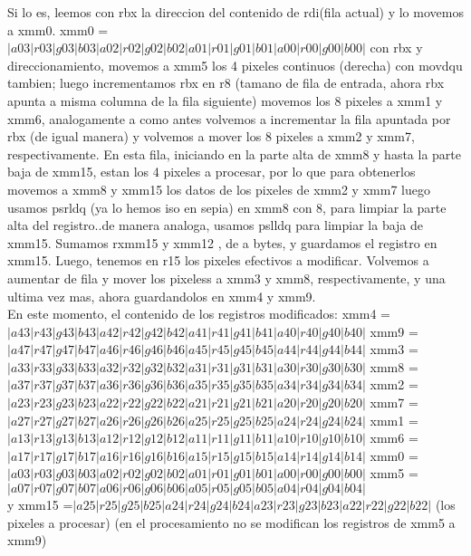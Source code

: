 \documentclass[a4paper]{article}
\begin{document}
	Si lo es, leemos con rbx la direccion del contenido de rdi(fila actual) y lo movemos a xmm0.	
	\hfill \break
	 xmm0 = $|a03|r03|g03|b03|a02|r02|g02|b02|a01|r01|g01|b01|a00|r00|g00|b00| $
	 \hfill \break
 con rbx y direccionamiento,	movemos a xmm5 los 4 pixeles continuos (derecha) con movdqu tambien;
 luego incrementamos rbx en r8 (tamano de fila de entrada, ahora rbx apunta a misma columna de la fila siguiente)
 movemos los 8 pixeles a xmm1 y xmm6, analogamente a como antes
 volvemos a incrementar la fila apuntada por rbx (de igual manera)
 y volvemos a mover los 8 pixeles a xmm2 y xmm7, respectivamente.
 \hfill \break
 En esta fila, iniciando en la parte alta de xmm8 y hasta la parte baja de xmm15,  estan los 4 pixeles a procesar, por lo que para obtenerlos movemos a xmm8 y xmm15 los datos de los pixeles de xmm2 y xmm7
 luego usamos psrldq (ya lo hemos iso en sepia) en xmm8 con 8, para limpiar la parte alta del registro..de manera analoga, usamos pslldq para limpiar la baja de xmm15. Sumamos rxmm15 y xmm12 , de a bytes, y guardamos el registro en xmm15. 
 Luego, tenemos en r15 los pixeles efectivos a modificar. 
 \hfill \break
 Volvemos a aumentar de fila y mover los pixeless a xmm3 y xmm8, respectivamente, y una ultima vez mas, ahora guardandolos en xmm4 y xmm9.
 \hfill \break
 \\
En este momento, el contenido de los registros modificados:
\hfill \break
xmm4 = $|a43|r43|g43|b43|a42|r42|g42|b42|a41|r41|g41|b41|a40|r40|g40|b40|$
\hfill \break
xmm9 = $|a47|r47|g47|b47|a46|r46|g46|b46|a45|r45|g45|b45|a44|r44|g44|b44|$
\hfill \break
xmm3 = $|a33|r33|g33|b33|a32|r32|g32|b32|a31|r31|g31|b31|a30|r30|g30|b30|$
\hfill \break
xmm8 = $|a37|r37|g37|b37|a36|r36|g36|b36|a35|r35|g35|b35|a34|r34|g34|b34|$
\hfill \break
xmm2 = $|a23|r23|g23|b23|a22|r22|g22|b22|a21|r21|g21|b21|a20|r20|g20|b20|$
\hfill \break
xmm7 = $|a27|r27|g27|b27|a26|r26|g26|b26|a25|r25|g25|b25|a24|r24|g24|b24| $
\hfill \break
xmm1 =$ |a13|r13|g13|b13|a12|r12|g12|b12|a11|r11|g11|b11|a10|r10|g10|b10|$
\hfill \break
xmm6 = $|a17|r17|g17|b17|a16|r16|g16|b16|a15|r15|g15|b15|a14|r14|g14|b14|$
\hfill \break
xmm0 =$ |a03|r03|g03|b03|a02|r02|g02|b02|a01|r01|g01|b01|a00|r00|g00|b00|$ 
\hfill \break
xmm5 =$ |a07|r07|g07|b07|a06|r06|g06|b06|a05|r05|g05|b05|a04|r04|g04|b04|$
\hfill \break
 \\
 
y xmm15 =$|a25|r25|g25|b25|a24|r24|g24|b24|a23|r23|g23|b23|a22|r22|g22|b22|$
\hfill \break 
(los pixeles a procesar) (en el procesamiento no se modifican los registros de xmm5 a xmm9) \hfill \break
\end{document}
